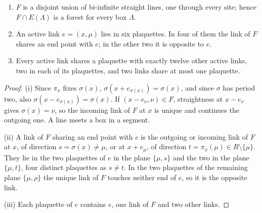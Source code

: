 \begin{lemma}\label{lem:structure}\leavevmode
\begin{enumerate}[label=\textup{(\roman*)},leftmargin=*]
\item $F$ is a disjoint union of bi-infinite straight lines, one through every
site; hence $F\cap E(\Lambda)$ is a forest for every box $\Lambda$.
\item An active link $e=(x,\mu)$ lies in six plaquettes. In four of them the
link of $F$ shares an end point with $e$; in the other two it is opposite to
$e$.
\item Every active link shares a plaquette with exactly twelve other active
links, two in each of its plaquettes, and two links share at most one
plaquette.
\end{enumerate}
\end{lemma}

\begin{proof}
(i) Since $\pi_x$ fixes $\sigma(x)$, $\sigma(x+e_{\sigma(x)})=\sigma(x)$, and since
$\sigma$ has period two, also $\sigma(x-e_{\sigma(x)})=\sigma(x)$. If $(x-e_\nu,\nu)
\in F$, straightness at $x-e_\nu$ gives $\sigma(x)=\nu$, so the incoming link of
$F$ at $x$ is unique and continues the outgoing one. A line meets a box in a
segment.

(ii) A link of $F$ sharing an end point with $e$ is the outgoing or incoming
link of $F$ at $x$, of direction $s=\sigma(x)\ne\mu$, or at $x+e_\mu$, of
direction $t=\pi_x(\mu)\in R\setminus\{\mu\}$. They lie in the two plaquettes of
$e$ in the plane $\{\mu,s\}$ and the two in the plane $\{\mu,t\}$, four distinct
plaquettes as $s\ne t$. In the two plaquettes of the remaining plane
$\{\mu,\rho\}$ the unique link of $F$ touches neither end of $e$, so it is the
opposite link.

(iii) Each plaquette of $e$ contains $e$, one link of $F$ and two other links.
\end{proof}

